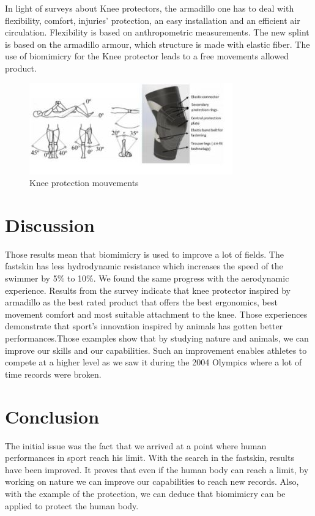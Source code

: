 \documentclass[twoside,twocolumn]{article}                          %
\begin{document}
In light of surveys about Knee protectors, the armadillo one has to deal with flexibility, comfort, injuries’ protection, an easy installation and an efficient air circulation. Flexibility is based on anthropometric measurements. The new splint is based on the armadillo armour, which structure is made with elastic fiber. The use of biomimicry for the Knee protector leads to a free movements allowed product.
\begin{figure}[!h]
  \begin{center}
    \includegraphics[scale=1.2]{knee2.JPG}
  \end{center}
  \caption{Knee protection mouvements}
  \end{figure}

\section{Discussion}
Those results mean that biomimicry is used to improve a lot of fields. The fastskin has less hydrodynamic resistance  which increases the speed of the swimmer by 5\% to 10\%. We found the same progress with the aerodynamic experience. Results from the survey indicate that knee protector inspired by armadillo as the best rated product that offers the best ergonomics, best movement comfort and most suitable attachment to the knee. Those experiences demonstrate that sport’s innovation inspired by animals has gotten better performances.Those examples show that by studying nature and animals, we can improve our skills and our capabilities. Such an improvement enables athletes to compete at a higher level as we saw it during the 2004 Olympics where a lot of time records were broken. 

\section{Conclusion}
The initial issue was the fact that we arrived at a point where human performances in sport reach his limit. With the search in the fastskin, results have been improved. It proves that even if the human body can reach a limit, by working on nature we can improve our capabilities to reach new records. Also, with the example of the protection, we can deduce that biomimicry can be applied to protect the human body. 
\end{document}
